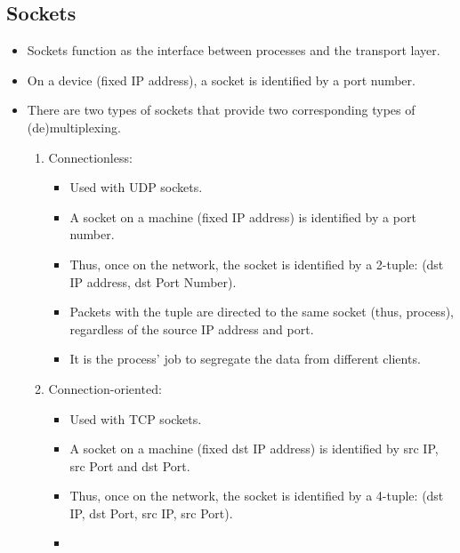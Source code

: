 \documentclass{report}
\begin{document}
\subsection{Sockets}
\begin{itemize}
\item Sockets function as the interface between processes and the transport layer.
\item On a device (fixed IP address), a socket is identified by a port number.
\item There are two types of sockets that provide two corresponding types of (de)multiplexing.
\begin{enumerate}
\item Connectionless:
\begin{itemize}
    \item Used with UDP sockets.
    \item A socket on a machine (fixed IP address) is identified by a port number.
    \item Thus, once on the network, the socket is identified by a 2-tuple: (dst IP address, dst Port Number).
    \item Packets with the tuple are directed to the same socket (thus, process),
    regardless of the source IP address and port.
    \item It is the process' job to segregate the data from different clients.
\end{itemize}
\item Connection-oriented:
\begin{itemize}
    \item Used with TCP sockets.
    \item A socket on a machine (fixed dst IP address) is identified by src IP, src Port and dst Port.
    \item Thus, once on the network, the socket is identified  by a 4-tuple: (dst IP, dst Port, src IP, src Port).
    \item 
\end{itemize}
\end{enumerate}
\end{itemize}
\end{document}
